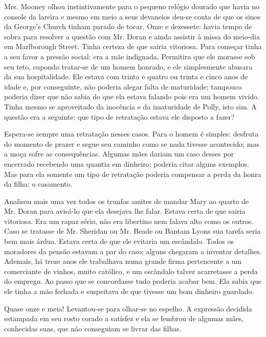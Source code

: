 Mrs. Mooney olhou instintivamente para o pequeno relógio dourado que
havia no console da lareira e mesmo em meio a seus devaneios deu-se
conta de que os sinos da George's Church tinham parado de tocar. Onze
e dezessete: havia tempo de sobra para resolver a questão com Mr.
Doran e ainda assistir à missa do meio-dia em Marlborough Street.
Tinha certeza de que sairia vitoriosa. Para começar tinha a seu favor
a pressão social: era a mãe indignada. Permitira que ele morasse sob
seu teto, supondo tratar-se de um homem honrado, e ele simplesmente
abusara da sua hospitalidade. Ele estava com trinta e quatro ou trinta
e cinco anos de idade e, por conseguinte, não poderia alegar falta de
maturidade; tampouco poderia dizer que não sabia do que ela estava
falando pois era um homem vivido. Tinha mesmo se aproveitado da
inocência e da imaturidade de Polly, isto sim. A questão era a
seguinte: que tipo de retratação estava ele disposto a fazer?

Espera-se sempre uma retratação nesses casos. Para o homem é simples:
desfruta do momento de prazer e segue seu caminho como se nada tivesse
acontecido; mas a moça sofre as consequências. Algumas mães dariam
um caso desses por encerrado recebendo uma quantia em dinheiro;
poderia citar alguns exemplos. Mas para ela somente um tipo de
retratação poderia compensar a perda da honra da filha: o casamento.

Analisou mais uma vez todos os trunfos amites de mandar Mary ao quarto
de Mr. Doran para avisá-lo que ela desejava lhe falar. Estava certa de
que sairia vitoriosa. Era um rapaz sério, não era libertino nem
falava alto como os outros. Caso se tratasse de Mr. Sheridan ou Mr.
Beade ou Bantam Lyons sua tarefa seria bem mais
árdua. Estava certa de que ele evitaria um escândalo. Todos os
moradores da pensão estavam a par do caso; alguns chegaram a inventar
detalhes. Ademais, há treze anos ele trabalhava numa grande firma
pertencente a um comerciante de vinhos, muito católico, e um escândalo
talvez acarretasse a perda do emprego. Ao passo que se concordasse
tudo poderia acabar bem. Ela sabia que ele tinha a mão fechada e
suspeitava de que tivesse um bom dinheiro guardado.

Quase onze e meia! Levantou-se para olhar-se no espelho. A expressão
decidida estampada em seu rosto corado a satisfez e ela se lembrou de
algumas mães, conhecidas suas, que não conseguiam se livrar das
filhas.

